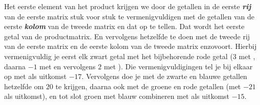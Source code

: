 Het eerste element van het product krijgen we door de getallen in de eerste \textit{\textbf{rij}} van de eerste matrix stuk voor stuk te vermenigvuldigen met de getallen van de eerste \textit{\textbf{kolom}} van de tweede matrix en dat op te tellen. Dat wordt het eerste getal van de productmatrix. En vervolgens hetzelfde te doen met de tweede rij van de eerste matrix en de eerste kolom van de tweede matrix enzovoort. 
Hierbij vermenigvuldig je eerst elk zwart getal  met het bijbehorende rode getal ($3$ met , daarna $-1$ met   en vervolgens $2$ met ). Die vermenigvuldigingen  tel je bij elkaar  op met als uitkomst $-17$. Vervolgens doe je met de zwarte en blauwe getallen  hetzelfde om $20$ te krijgen, daarna ook met de groene en rode getallen  (met $-21$ als uitkomst), en tot slot groen met blauw combineren met als uitkomst $-15$.

